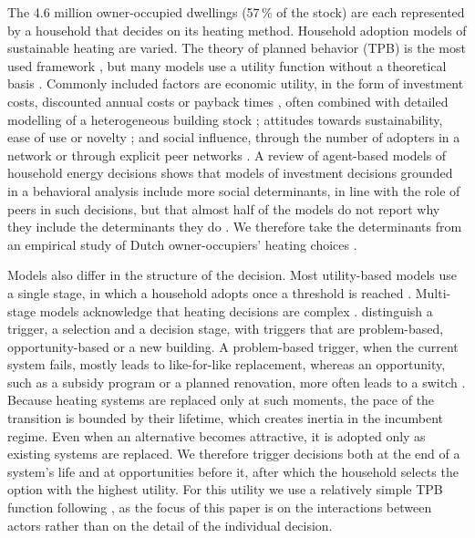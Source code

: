 \documentclass[preprint,12pt,authoryear]{elsarticle}
\begin{document}
The 4.6 million owner-occupied dwellings (57\,\% of the stock) are each
represented by a household that decides on its heating method. Household
adoption models of sustainable heating are varied. The theory of planned
behavior (TPB) is the most used framework
\citep{sophaExploringPolicyOptions2011,sophaAdoptionDiffusionHeating2013,
okurAdoptionRenewableHeating2024}, but many models use a utility function
without a theoretical basis \citep{raoCriticalReviewHeat2025}. Commonly
included factors are economic utility, in the form of investment costs,
discounted annual costs or payback times
\citep[e.g.][]{snapeWillDomesticConsumers2015,melesAdoptionRenewableHome2022,
michelsenMotivationalFactorsInfluencing2013}, often combined with detailed
modelling of a heterogeneous building stock
\citep[e.g.][]{leeAnalysisUKPolicies2014}; attitudes towards sustainability,
ease of use or novelty \citep[e.g.][]{snapeWillDomesticConsumers2015,
melesAdoptionRenewableHome2022}; and social influence, through the number of
adopters in a network or through explicit peer networks
\citep[e.g.][]{snapeWillDomesticConsumers2015,
navaguerreroAgentBasedModelingThermal2019,melesAdoptionRenewableHome2022}. A
review of agent-based models of household energy decisions shows that models
of investment decisions grounded in a behavioral analysis include more social
determinants, in line with the role of peers in such decisions, but that
almost half of the models do not report why they include the determinants
they do \citep{rietkerkBridgingBehavioralTheory2025}. We therefore take the
determinants from an empirical study of
Dutch owner-occupiers' heating choices
\citep{okurAdoptionRenewableHeating2024}.

Models also differ in the structure of the decision. Most utility-based
models use a single stage, in which a household adopts once a threshold is
reached \citep[e.g.][]{snapeWillDomesticConsumers2015,
melesAdoptionRenewableHome2022}. Multi-stage models acknowledge that heating
decisions are complex \citep{ebrahimigharehbaghiUnravellingDutchHomeowners2019}. 
\citet{hecherTriggerMattersDecisionmaking2017}
distinguish a trigger, a selection and a decision stage, with triggers that
are problem-based, opportunity-based or a new building. A problem-based
trigger, when the current system fails, mostly leads to like-for-like
replacement, whereas an opportunity, such as a subsidy program or a planned
renovation, more often leads to a switch
\citep{broersDecidedDividedEmpirical2019}. Because heating systems are
replaced only at such moments, the pace of the transition is bounded by their
lifetime, which creates inertia in the incumbent regime. Even when an
alternative becomes attractive, it is adopted only as existing systems are
replaced. We therefore trigger decisions both at the end of a system's life
and at opportunities before it, after which the household selects the option
with the highest utility. For this utility we use a relatively simple TPB
function following \citet{okurAdoptionRenewableHeating2024}, as the focus of
this paper is on the interactions between actors rather than on the detail of
the individual decision.
\end{document}
